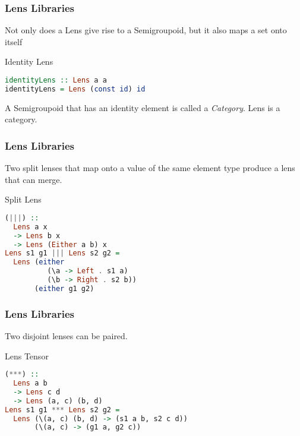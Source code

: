 \begin{frame}[fragile]
\frametitle{Lens Libraries}


Not only does a Lens give rise to a Semigroupoid, but it also maps a set onto itself

\begin{block}{Identity Lens}
\begin{lstlisting}[language=haskell]
identityLens :: Lens a a
identityLens = Lens (const id) id
\end{lstlisting}
\end{block}

A Semigroupoid that has an identity element is called a \emph{Category}. Lens is a category.

\end{frame}

\begin{frame}[fragile]
\frametitle{Lens Libraries}

Two split lenses that map onto a value of the same element type produce a lens that can merge.

\begin{block}{Split Lens}
\begin{lstlisting}[language=haskell]
(|||) ::
  Lens a x
  -> Lens b x
  -> Lens (Either a b) x
Lens s1 g1 ||| Lens s2 g2 =
  Lens (either
          (\a -> Left . s1 a) 
          (\b -> Right . s2 b))
       (either g1 g2)
\end{lstlisting}
\end{block}

\end{frame}

\begin{frame}[fragile]
\frametitle{Lens Libraries}

Two disjoint lenses can be paired.

\begin{block}{Lens Tensor}
\begin{lstlisting}[language=haskell]
(***) ::
  Lens a b
  -> Lens c d
  -> Lens (a, c) (b, d)
Lens s1 g1 *** Lens s2 g2 =
  Lens (\(a, c) (b, d) -> (s1 a b, s2 c d))
       (\(a, c) -> (g1 a, g2 c))
\end{lstlisting}
\end{block}

\end{frame}

